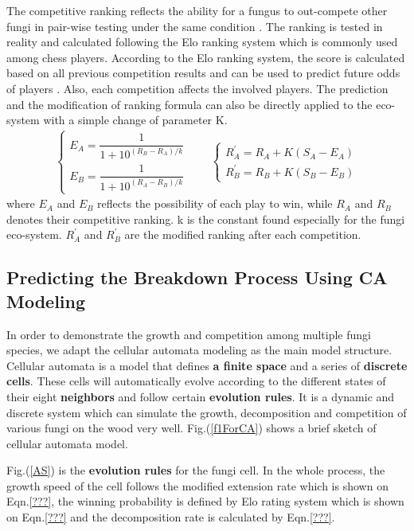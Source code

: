 \documentclass[a4paper,12pt]{article}
\begin{document}
The competitive ranking reflects the ability for a fungus to out-compete other fungi in pair-wise testing under the same condition \cite{MCM}. The ranking is tested in reality and calculated following the Elo ranking system which is commonly used among chess players. According to the Elo ranking system, the score is calculated based on all previous competition results and can be used to predict future odds of players \cite{chess}. Also, each competition affects the involved players. The prediction and the modification of ranking formula can also be directly applied to the eco-system with a simple change of parameter K.
\begin{align*}
\left\{ \begin{array}{c}
E_A= \dfrac{1}{1+10^{(R_B-R_A)/k}} \\
E_B= \dfrac{1}{1+10^{(R_A-R_B)/k}}
\end{array} \right. \qquad  \left\{ \begin{array}{c}
R^{'}_A=R_A + K(S_A-E_A) \\
R^{'}_B=R_B + K(S_B-E_B)
\end{array} \right.
\end{align*} where $E_A$ and $E_B$ reflects the possibility of each play to win, while $R_A$ and $R_B$ denotes their competitive ranking. k is the constant found especially for the fungi eco-system. $R^{'}_A$ and $R^{'}_B$ are the modified ranking after each competition.

\subsection{Predicting the Breakdown Process Using CA Modeling}
In order to demonstrate the growth and competition among multiple fungi species, we adapt the cellular automata modeling as the main model structure. Cellular automata is a model that defines \textbf{a finite space} and a series of \textbf{discrete cells}. These cells will automatically evolve according to the different states of their eight \textbf{neighbors} and follow certain \textbf{evolution rules}. It is a dynamic and discrete system which can simulate the growth, decomposition and competition of various fungi on the wood very well. Fig.(\ref{f1ForCA}) shows a brief sketch of cellular automata model.


\par Fig.(\ref{AS}) is the \textbf{evolution rules} for the fungi cell. In the whole process, the growth speed of the cell follows the modified extension rate which is shown on Eqn.\eqref{???}, the winning probability is defined by Elo rating system which is shown on Eqn.\eqref{???} and the decomposition rate is calculated by Eqn.\eqref{???}.
\end{document}
